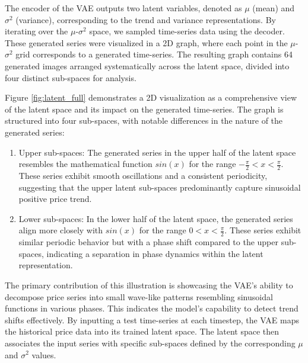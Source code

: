 The encoder of the VAE outputs two latent variables, denoted as $\mu$ (mean) and $\sigma^2$ (variance), corresponding to the trend and variance representations. By iterating over the $\mu$-$\sigma^2$ space, we sampled time-series data using the decoder. These generated series were visualized in a 2D graph, where each point in the $\mu$-$\sigma^2$ grid corresponds to a generated time-series. The resulting graph contains 64 generated images arranged systematically across the latent space, divided into four distinct sub-spaces for analysis.

Figure \ref{fig:latent_full} demonstrates a 2D visualization as a comprehensive view of the latent space and its impact on the generated time-series. The graph is structured into four sub-spaces, with notable differences in the nature of the generated series:

\begin{enumerate}
	\item Upper sub-spaces:
	The generated series in the upper half of the latent space resembles the mathematical function $sin(x)$ for the range $-\frac{\pi}{2} < x < \frac{\pi}{2}$. These series exhibit smooth oscillations and a consistent periodicity, suggesting that the upper latent sub-spaces predominantly capture sinusoidal positive price trend.
	
	\item Lower sub-spaces:
	In the lower half of the latent space, the generated series align more closely with $sin(x)$ for the range $0 < x < \frac{\pi}{2}$. These series exhibit similar periodic behavior but with a phase shift compared to the upper sub-spaces, indicating a separation in phase dynamics within the latent representation.
	
\end{enumerate}

The primary contribution of this illustration is showcasing the VAE's ability to decompose price series into small wave-like patterns resembling sinusoidal functions in various phases. This indicates the model's capability to detect trend shifts effectively. By inputting a test time-series at each timestep, the VAE maps the historical price data into its trained latent space. The latent space then associates the input series with specific sub-spaces defined by the corresponding $\mu$ and $\sigma^2$ values.

